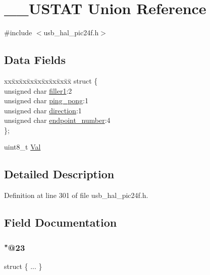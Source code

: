 \hypertarget{union_____u_s_t_a_t}{}\section{\+\_\+\+\_\+\+U\+S\+T\+AT Union Reference}
\label{union_____u_s_t_a_t}


{\ttfamily \#include $<$usb\+\_\+hal\+\_\+pic24f.\+h$>$}

\subsection*{Data Fields}
\begin{DoxyCompactItemize}
\item 
\begin{tabbing}
xx\=xx\=xx\=xx\=xx\=xx\=xx\=xx\=xx\=\kill
struct \{\\
\>unsigned char \mbox{\hyperlink{union_____u_s_t_a_t_a54acb45d462e0ff47705a7514916273d}{filler1}}:2\\
\>unsigned char \mbox{\hyperlink{union_____u_s_t_a_t_a9ec468b66f0444dc9be4ec11f75a0a5f}{ping\_pong}}:1\\
\>unsigned char \mbox{\hyperlink{union_____u_s_t_a_t_a4c9b82152ef06a9d3b78f60779cd4b85}{direction}}:1\\
\>unsigned char \mbox{\hyperlink{union_____u_s_t_a_t_a4f411fec039d172f03e2a41d46ff58ca}{endpoint\_number}}:4\\
\}; \\

\end{tabbing}\item 
uint8\+\_\+t \mbox{\hyperlink{union_____u_s_t_a_t_aa0c179f4462bb12ca1ed40d18c89cda1}{Val}}
\end{DoxyCompactItemize}


\subsection{Detailed Description}


Definition at line 301 of file usb\+\_\+hal\+\_\+pic24f.\+h.



\subsection{Field Documentation}
\mbox{\label{union_____u_s_t_a_t_a30d2e2541829378fd67f46fa4d61949c}} 
\subsubsection{\texorpdfstring{"@23}{@23}}
{\footnotesize\ttfamily struct \{ ... \} }


